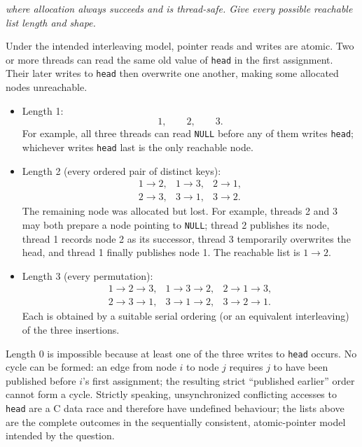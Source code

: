 \documentclass[11pt,a4paper]{article}
\begin{document}
\emph{where allocation always succeeds and is thread-safe.  Give every
possible reachable list length and shape.}

Under the intended interleaving model, pointer reads and writes are atomic.
Two or more threads can read the same old value of \texttt{head} in the
first assignment.  Their later writes to \texttt{head} then overwrite one
another, making some allocated nodes unreachable.

\begin{itemize}
\item Length 1:
\[
1,\qquad 2,\qquad 3.
\]
For example, all three threads can read \texttt{NULL} before any of them
writes \texttt{head}; whichever writes \texttt{head} last is the only
reachable node.

\item Length 2 (every ordered pair of distinct keys):
\[
\begin{array}{lll}
1\mathbin{\to}2,&1\mathbin{\to}3,&
2\mathbin{\to}1,\\
2\mathbin{\to}3,&3\mathbin{\to}1,&
3\mathbin{\to}2.
\end{array}
\]
The remaining node was allocated but lost.  For example, threads 2 and 3
may both prepare a node pointing to \texttt{NULL}; thread 2 publishes its
node, thread 1 records node 2 as its successor, thread 3 temporarily
overwrites the head, and thread 1 finally publishes node 1.  The reachable
list is \(1\to2\).

\item Length 3 (every permutation):
\[
\begin{array}{lll}
1\mathbin{\to}2\mathbin{\to}3,&
1\mathbin{\to}3\mathbin{\to}2,&
2\mathbin{\to}1\mathbin{\to}3,\\
2\mathbin{\to}3\mathbin{\to}1,&
3\mathbin{\to}1\mathbin{\to}2,&
3\mathbin{\to}2\mathbin{\to}1.
\end{array}
\]
Each is obtained by a suitable serial ordering (or an equivalent
interleaving) of the three insertions.
\end{itemize}

Length 0 is impossible because at least one of the three writes to
\texttt{head} occurs.  No cycle can be formed: an edge from node \(i\) to
node \(j\) requires \(j\) to have been published before \(i\)'s first
assignment; the resulting strict ``published earlier'' order cannot form a
cycle.  Strictly speaking, unsynchronized conflicting accesses to
\texttt{head} are a C data race and therefore have undefined behaviour;
the lists above are the complete outcomes in the sequentially consistent,
atomic-pointer model intended by the question.
\end{document}
